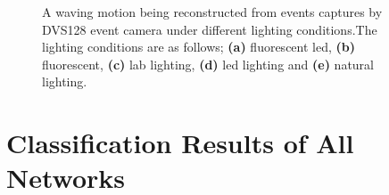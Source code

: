 \begin{figure}[htb]%
    \centering
    \qquad
    \qquad
    \qquad
    \qquad
    \caption{A waving motion being reconstructed from events captures by DVS128 event camera under different lighting conditions.The lighting conditions are as follows; \textbf{(a)} fluorescent led, \textbf{(b)} fluorescent, \textbf{(c)} lab lighting, \textbf{(d)} led lighting and \textbf{(e)} natural lighting.}%
    \label{fig:wave_in_lightings_reconstructions}%
\end{figure}

\section{Classification Results of All Networks}


